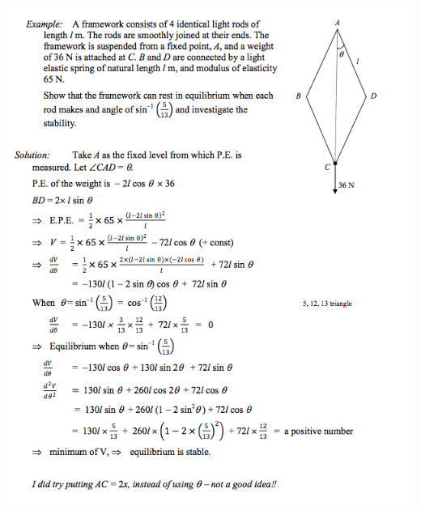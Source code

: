\documentclass[a4paper]{article}
\begin{document}
\begin{center}
    \includegraphics[scale=0.5]{img_M/20_eg3}
\end{center}
\end{document}
